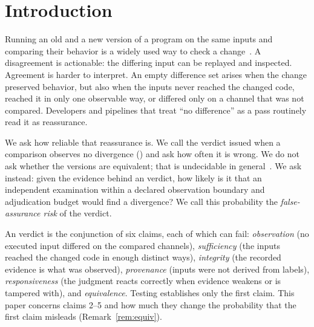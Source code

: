 \documentclass{ieeeaccess}
\begin{document}
\titlepgskip=-21pt

\maketitle

\section{Introduction}\label{sec:intro}
Running an old and a new version of a program on the same inputs and comparing their behavior is a widely used way to check a change~\cite{evans2007differential,mckeeman1998differential}. A disagreement is actionable: the differing input can be replayed and inspected. Agreement is harder to interpret. An empty difference set arises when the change preserved behavior, but also when the inputs never reached the changed code, reached it in only one observable way, or differed only on a channel that was not compared. Developers and pipelines that treat ``no difference'' as a pass routinely read it as reassurance.

We ask how reliable that reassurance is. We call the verdict issued when a comparison observes no divergence \NDOfull{} (\NDO{}) and ask how often it is wrong. We do not ask whether the versions are equivalent; that is undecidable in general~\cite{godlin2009regression,lahiri2012symdiff}. We ask instead: given the evidence behind an \NDO{} verdict, how likely is it that an independent examination within a declared observation boundary and adjudication budget would find a divergence? We call this probability the \emph{false-assurance risk} of the verdict.

An \NDO{} verdict is the conjunction of six claims, each of which can fail: \emph{observation} (no executed input differed on the compared channels), \emph{sufficiency} (the inputs reached the changed code in enough distinct ways), \emph{integrity} (the recorded evidence is what was observed), \emph{provenance} (inputs were not derived from labels), \emph{responsiveness} (the judgment reacts correctly when evidence weakens or is tampered with), and \emph{equivalence}. Testing establishes only the first claim. This paper concerns claims 2--5 and how much they change the probability that the first claim misleads (Remark~\ref{rem:equiv}).
\end{document}
